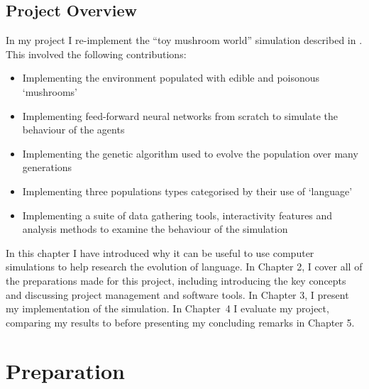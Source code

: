 \documentclass[12pt,a4paper,twoside,openright]{report}
\begin{document}
\section{Project Overview}

In my project I re-implement the ``toy mushroom world'' simulation described in \citet{Cangelosi1998}. This involved the following contributions:

\begin{itemize}
	\item Implementing the environment populated with edible and poisonous `mushrooms'
	\item Implementing feed-forward neural networks from scratch to simulate the behaviour of the agents
	\item Implementing the genetic algorithm used to evolve the population over many generations
	\item Implementing three populations types categorised by their use of `language'
	\item Implementing a suite of data gathering tools, interactivity features and analysis methods to examine the behaviour of the simulation
\end{itemize}

In this chapter I have introduced why it can be useful to use computer simulations to help research the evolution of language. In Chapter 2, I cover all of the preparations made for this project, including introducing the key concepts and discussing project management and software tools. In Chapter 3, I present my implementation of the simulation. In Chapter~4 I evaluate my project, comparing my results to \citet{Cangelosi1998} before presenting my concluding remarks in Chapter 5. 


\chapter{Preparation}\label{chapter:preparation}
\end{document}
